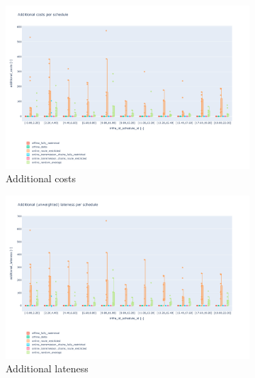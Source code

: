 \documentclass{article}
\begin{document}
\begin{figure}[hbtp]
        \begin{subfigure}{\textwidth}
            \includegraphics[width=\textwidth]{Figures/04_computational_results/additional_costs.pdf}
            \caption{Additional costs}
             \label{fig:additional_costs}
        \end{subfigure}
        \begin{subfigure}{\textwidth}
            \includegraphics[width=\textwidth]{Figures/04_computational_results/additional_lateness.pdf}
            \caption{Additional lateness}
             \label{fig:additional_lateness}
        \end{subfigure}
        \begin{subfigure}{\textwidth}

\end{subfigure}
\end{figure}
\end{document}
